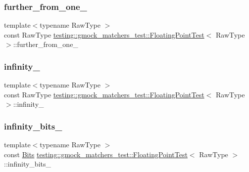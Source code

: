 \subsubsection{\texorpdfstring{further\_from\_one\_}{further\_from\_one\_}}
{\footnotesize\ttfamily template$<$typename Raw\+Type $>$ \\
const Raw\+Type \mbox{\hyperlink{classtesting_1_1gmock__matchers__test_1_1_floating_point_test}{testing\+::gmock\+\_\+matchers\+\_\+test\+::\+Floating\+Point\+Test}}$<$ Raw\+Type $>$\+::further\+\_\+from\+\_\+one\+\_\+\hspace{0.3cm}{\ttfamily [protected]}}

\mbox{\label{classtesting_1_1gmock__matchers__test_1_1_floating_point_test_a21d8a019a6365ddff80e301a6163f43f}} 
\subsubsection{\texorpdfstring{infinity\_}{infinity\_}}
{\footnotesize\ttfamily template$<$typename Raw\+Type $>$ \\
const Raw\+Type \mbox{\hyperlink{classtesting_1_1gmock__matchers__test_1_1_floating_point_test}{testing\+::gmock\+\_\+matchers\+\_\+test\+::\+Floating\+Point\+Test}}$<$ Raw\+Type $>$\+::infinity\+\_\+\hspace{0.3cm}{\ttfamily [protected]}}

\mbox{\label{classtesting_1_1gmock__matchers__test_1_1_floating_point_test_a3c25f403d51e6c8ed3fe7856cab1330b}} 
\subsubsection{\texorpdfstring{infinity\_bits\_}{infinity\_bits\_}}
{\footnotesize\ttfamily template$<$typename Raw\+Type $>$ \\
const \mbox{\hyperlink{classtesting_1_1gmock__matchers__test_1_1_floating_point_test_addf899bd832ae51103198d201d2f2ea2}{Bits}} \mbox{\hyperlink{classtesting_1_1gmock__matchers__test_1_1_floating_point_test}{testing\+::gmock\+\_\+matchers\+\_\+test\+::\+Floating\+Point\+Test}}$<$ Raw\+Type $>$\+::infinity\+\_\+bits\+\_\+\hspace{0.3cm}{\ttfamily [protected]}}

